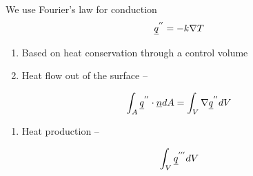\documentclass[aspectratio=1610,pdftex,dvipsnames,compress,xcolor={dvipsnames}]{beamer}
\begin{document}
\addtocounter{framenumber}{-1} 
\begin{frame}{We use Fourier's law for conduction}
    \begin{equation}
        \LARGE
        \underline{q}^{''} = -k\nabla T
    \end{equation}

    \vspace*{\fill}

    \begin{enumerate}[series=outerlist,topsep=0pt,itemsep=21pt,leftmargin=*,label=(\arabic*)]
        \item[]Based on heat conservation through a control volume
        \item[]Heat flow out of the surface --
    \end{enumerate}

    \vspace*{\fill}

    \begin{equation}
        \LARGE
        \int_A \underline{q}^{''} \cdot \underline{n}dA = \int_V \nabla \underline{q}^{''} dV
    \end{equation}

    \vspace*{\fill}

    \begin{enumerate}[series=outerlist,topsep=0pt,itemsep=21pt,leftmargin=*,label=(\arabic*)]
        \item[]Heat production --
    \end{enumerate}

    \vspace*{\fill}

    \begin{equation}
        \LARGE
        \int_V \underline{q}^{'''} dV
    \end{equation}
\end{frame}
\end{document}
